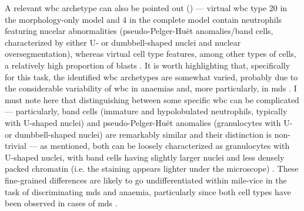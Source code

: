 \begin{figure}[!ht]
    \label{fig:mile-vice-vcq-so-disease-detection}
\end{figure}

\begin{figure}[!ht]
    \label{fig:rbc-disease-detection-examples}
\end{figure}

A relevant \ac{wbc} archetype can also be pointed out () --- virtual \ac{wbc} type 20 in the morphology-only model and 4 in the complete model contain neutrophils featuring nucelar abnormalities (pseudo-Pelger-Huët anomalies/band cells, characterized by either U- or dumbbell-shaped nuclei \cite{Bain2005-zg} and nuclear oversegmentation), whereas virtual cell type features, among other types of cells, a relatively high proportion of blasts . It is worth highlighting that, specifically for this task, the identified \ac{wbc} archetypes are somewhat varied, probably due to the considerable variability of \ac{wbc} in anaemias and, more particularly, in \ac{mds} \cite{Bain2005-zg,Bain2014-oc}. I must note here that distinguishing between some specific \ac{wbc} can be complicated --- particularly, band cells (immature and hypolobulated neutrophils, typically with U-shaped nuclei) and pseudo-Pelger-Huët anomalies (granulocytes with U- or dumbbell-shaped nuclei) are remarkably similar and their distinction is non-trivial --- as mentioned, both can be loosely characterized as granulocytes with U-shaped nuclei, with band cells having slightly larger nuclei and less densely packed chromatin (i.e. the staining appears lighter under the microscope) \cite{Colella2012-so}. These fine-grained differences are likely to go undifferentiated within \ac{mile-vice} in the task of discriminating \ac{mds} and anaemia, particularly since both cell types have been observed in cases of \ac{mds} \cite{Davey1988-zn,Cunningham1995-pc}.

